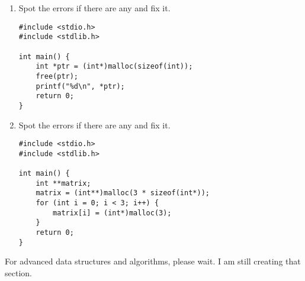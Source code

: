 \documentclass[a4paper,12pt]{article}
\begin{document}
\begin{enumerate}
    \item Spot the errors if there are any and fix it.

\begin{lstlisting}
#include <stdio.h>
#include <stdlib.h>

int main() {
    int *ptr = (int*)malloc(sizeof(int));
    free(ptr); 
    printf("%d\n", *ptr);
    return 0;
}\end{lstlisting}

    \item Spot the errors if there are any and fix it.

\begin{lstlisting}
#include <stdio.h>
#include <stdlib.h>

int main() {
    int **matrix;
    matrix = (int**)malloc(3 * sizeof(int*));
    for (int i = 0; i < 3; i++) {
        matrix[i] = (int*)malloc(3);
    }
    return 0;
}\end{lstlisting}

\end{enumerate}

For advanced data structures and algorithms, please wait. I am still creating that section.
\end{document}
